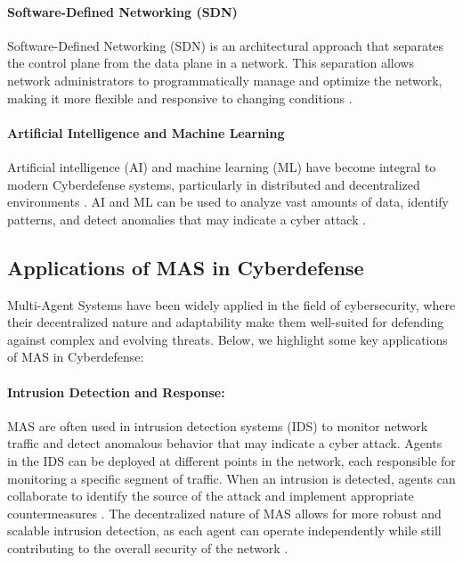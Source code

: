 \paragraph{Software-Defined Networking (SDN)}

Software-Defined Networking (SDN) is an architectural approach that separates the control plane from the data plane in a network. This separation allows network administrators to programmatically manage and optimize the network, making it more flexible and responsive to changing conditions \cite{Kreutz2015}.

\paragraph{Artificial Intelligence and Machine Learning}

Artificial intelligence (AI) and machine learning (ML) have become integral to modern Cyberdefense systems, particularly in distributed and decentralized environments \cite{Buczak2016}. AI and ML can be used to analyze vast amounts of data, identify patterns, and detect anomalies that may indicate a cyber attack \cite{Vinayakumar2019}.


\subsection{Applications of MAS in Cyberdefense}

Multi-Agent Systems have been widely applied in the field of cybersecurity, where their decentralized nature and adaptability make them well-suited for defending against complex and evolving threats. Below, we highlight some key applications of MAS in Cyberdefense:

\paragraph{Intrusion Detection and Response:}
MAS are often used in intrusion detection systems (IDS) to monitor network traffic and detect anomalous behavior that may indicate a cyber attack. Agents in the IDS can be deployed at different points in the network, each responsible for monitoring a specific segment of traffic. When an intrusion is detected, agents can collaborate to identify the source of the attack and implement appropriate countermeasures \cite{kolias2011swarm}. The decentralized nature of MAS allows for more robust and scalable intrusion detection, as each agent can operate independently while still contributing to the overall security of the network \cite{kolias2011swarm}.

